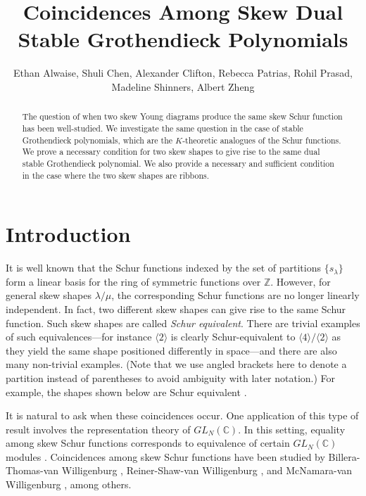 \documentclass[12pt]{amsart}
\theoremstyle{definition}
\begin{document}
\title{Coincidences Among Skew Dual Stable Grothendieck Polynomials}
\author{Ethan Alwaise, Shuli Chen, Alexander Clifton, Rebecca Patrias, Rohil Prasad, Madeline Shinners, Albert Zheng}
\maketitle


\begin{abstract}
The question of when two skew Young diagrams produce the same skew Schur function has been well-studied. We investigate the same question in the case of stable Grothendieck polynomials, which are the $K$-theoretic analogues of the Schur functions. We prove a necessary condition for two skew shapes to give rise to the same dual stable Grothendieck polynomial. We also provide a necessary and sufficient condition in the case where the two skew shapes are ribbons.
\end{abstract}

\section{Introduction}
It is well known that the Schur functions indexed by the set of partitions $\{s_{\lambda}\}$ form a linear basis for the ring of symmetric functions over $\mathbb{Z}$. However, for general skew shapes $\lambda / \mu$, the corresponding Schur functions are no longer linearly independent. In fact, two different skew shapes can give rise to the same Schur function. Such skew shapes are called \textit{Schur equivalent}. There are trivial examples of such equivalences---for instance $\langle 2 \rangle$ is clearly Schur-equivalent to $\langle 4 \rangle / \langle 2 \rangle$ as they yield the same shape positioned differently in space---and there are also many non-trivial examples. (Note that we use angled brackets here to denote a partition instead of parentheses to avoid ambiguity with later notation.) For example, the shapes shown below are Schur equivalent \cite{rsw2009coincidences}.
\begin{center}
\qquad{}
\end{center}


It is natural to ask when these coincidences occur. One application of this type of result involves the representation theory of $GL_N(\mathbb{C})$. In this setting, equality among skew Schur functions corresponds to equivalence of certain $GL_N(\mathbb{C})$ modules \cite{rsw2009coincidences}.
Coincidences among skew Schur functions have been studied by Billera-Thomas-van Willigenburg \cite{billera2006decomposable}, Reiner-Shaw-van Willigenburg \cite{rsw2009coincidences}, and McNamara-van Willigenburg \cite{mcnamara2009towards}, among others. 

\end{document}

